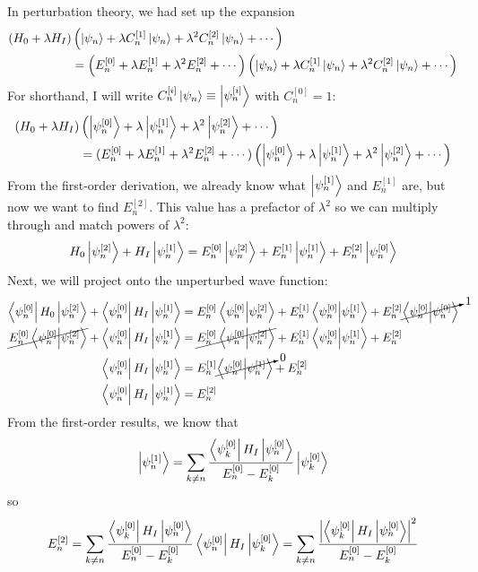 \documentclass[a4paper,twoside]{article}
\begin{document}
\begin{problem}
    In perturbation theory, we had set up the expansion
    \begin{align}
        (H_0 + \lambda H_I)&\left(\ket{\psi_n} + \lambda C_n^{[1]} \ket{\psi_n} + \lambda^2 C_n^{[2]} \ket{\psi_n} + \cdots\right) \\
        &= \left(E_n^{[0]} + \lambda E_n^{[1]} + \lambda^2 E_n^{[2]} + \cdots\right)\left(\ket{\psi_n} + \lambda C_n^{[1]} \ket{\psi_n} + \lambda^2 C_n^{[2]} \ket{\psi_n} + \cdots\right)
    \end{align}
    For shorthand, I will write $ C_n^{[i]}\ket{\psi_n} \equiv\ket{\psi_n^{[i]}} $ with $ C_n^{[0]} = 1 $:
    \begin{align}
        (H_0 + \lambda H_I)&\left( \ket{\psi_n^{[0]}} + \lambda \ket{\psi_n^{[1]}} + \lambda^2 \ket{\psi_n^{[2]}} + \cdots\right) \\
        &= (E_n^{[0]} + \lambda E_n^{[1]} + \lambda^2 E_n^{[2]} +\cdots) \left( \ket{\psi_n^{[0]}} + \lambda \ket{\psi_n^{[1]}} + \lambda^2 \ket{\psi_n^{[2]}} + \cdots \right)
    \end{align}
    From the first-order derivation, we already know what $ \ket{\psi_n^{[1]}} $ and $ E_n^{[1]} $ are, but now we want to find $ E_n^{[2]} $. This value has a prefactor of $ \lambda^2 $ so we can multiply through and match powers of $ \lambda^2 $:
    \begin{equation}
        H_0 \ket{\psi_n^{[2]}} + H_I\ket{\psi_n^{[1]}} = E_n^{[0]}\ket{\psi_n^{[2]}} + E_n^{[1]}\ket{\psi_n^{[1]}} + E_n^{[2]}\ket{\psi_n^{[0]}} 
    \end{equation}
    Next, we will project onto the unperturbed wave function:
    \begin{align}
        \bra{\psi_n^{[0]}} H_0\ket{\psi_n^{[2]}} +\bra{\psi_n^{[0]}} H_I\ket{\psi_n^{[1]}} &= E_n^{[0]}\bra{\psi_n^{[0]}}\ket{\psi_n^{[2]}} + E_n^{[1]}\bra{\psi_n^{[0]}}\ket{\psi_n^{[1]}} + E_n^{[2]}\cancelto{1}{\bra{\psi_n^{[0]}}\ket{\psi_n^{[0]}}} \\
        \cancel{E_n^{[0]}\bra{\psi_n^{[0]}}\ket{\psi_n^{[2]}}} +\bra{\psi_n^{[0]}} H_I\ket{\psi_n^{[1]}} &= \cancel{E_n^{[0]}\bra{\psi_n^{[0]}}\ket{\psi_n^{[2]}}} + E_n^{[1]}\bra{\psi_n^{[0]}}\ket{\psi_n^{[1]}} + E_n^{[2]} \\
        \bra{\psi_n^{[0]}} H_I\ket{\psi_n^{[1]}} &= E_n^{[1]}\cancelto{0}{\bra{\psi_n^{[0]}}\ket{\psi_n^{[1]}}} + E_n^{[2]} \\
        \bra{\psi_n^{[0]}} H_I\ket{\psi_n^{[1]}} &= E_n^{[2]} 
    \end{align}
    From the first-order results, we know that
    \begin{equation}
        \ket{\psi_n^{[1]}} = \sum_{k \neq n} \frac{\bra{\psi_k^{[0]}} H_I\ket{\psi_n^{[0]}}}{E_n^{[0]} - E_k^{[0]}}\ket{\psi_k^{[0]}}
    \end{equation}
    so
    \begin{equation}
        E_n^{[2]} = \sum_{k \neq n} \frac{\bra{\psi_k^{[0]}} H_I\ket{\psi_n^{[0]}}}{E_n^{[0]} - E_k^{[0]}}\bra{\psi_n^{[0]}} H_I\ket{\psi_k^{[0]}} = \sum_{k \neq n} \frac{\abs{\bra{\psi_k^{[0]}} H_I\ket{\psi_n^{[0]}}}^2}{E_n^{[0]} - E_k^{[0]}}
    \end{equation}
\end{problem}
\end{document}
